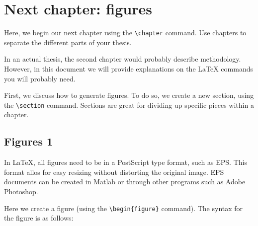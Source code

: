 \documentclass[master]{UWMThesis}
\begin{document}
\chapter{Next chapter: figures}  \label{sec:chap_figs}

Here, we begin our next chapter using the \verb=\chapter= command.  Use chapters to separate the different parts of your thesis.

In an actual thesis, the second chapter would probably describe methodology.  However, in this document we will provide explanations on the LaTeX commands you will probably need.

First, we discuss how to generate figures.  To do so, we create a new section, using the \verb=\section= command.  Sections are great for dividing up specific pieces within a chapter.

	\section{Figures 1} \label{sec:fig1}
  In LaTeX, all figures need to be in a PostScript type format, such as EPS.  This format allos for easy resizing without distorting the original image.  EPS documents can be created in Matlab or through other programs such as Adobe Photoshop.
	
	Here we create a figure (using the \verb=\begin{figure}= command).  The syntax for the figure is as follows:
\end{document}

